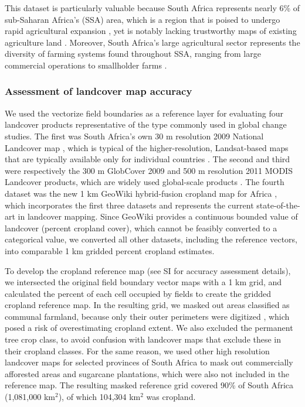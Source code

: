 \documentclass[a4paper]{article}
\begin{document}
This dataset is particularly valuable because South Africa represents nearly 6\% of sub-Saharan Africa's (SSA) area, which is a region that is poised to undergo rapid agricultural expansion \citep{searchinger_high_2015}, yet is notably lacking trustworthy maps of existing agriculture land \citep{fritz_comparison_2010}. Moreover, South Africa's large agricultural sector represents the diversity of farming systems found throughout SSA, ranging from large commercial operations to smallholder farms \citep{hardy_rainfed_2011,estes_using_2014}.

\subsubsection*{Assessment of landcover map accuracy}
We used the vectorize field boundaries as a reference layer for evaluating four landcover products representative of the type commonly used in global change studies. The first was South Africa's own 30 m resolution 2009 National Landcover map \citep[SA-LC][]{sanbi_national_2009}, which is typical of the higher-resolution, Landsat-based maps that are typically available only for individual countries \citep[e.g.][]{fry_completion_2009}. The second and third were respectively the 300 m GlobCover 2009 \citep{arino_global_2012} and 500 m resolution 2011 MODIS Landcover products, which are widely used global-scale products \citep[e.g.][]{gross_monitoring_2013, shackelford_conservation_2015}. The fourth dataset was the new 1 km GeoWiki hybrid-fusion cropland map for Africa \citep{fritz_mapping_2015}, which incorporates the first three datasets and represents the current state-of-the-art in landcover mapping.  Since GeoWiki provides a continuous bounded value of landcover (percent cropland cover), which cannot be feasibly converted to a categorical value, we converted all other datasets, including the reference vectors, into comparable 1 km gridded percent cropland estimates. 

To develop the cropland reference map (see SI for accuracy assessment details), we intersected the original field boundary vector maps with a 1 km grid, and calculated the percent of each cell occupied by fields to create the gridded cropland reference map. In the resulting grid, we masked out areas classified as communal farmland, because only their outer perimeters were digitized \citep{fourie_better_2009}, which posed a risk of overestimating cropland extent. We also excluded the permanent tree crop class, to avoid confusion with landcover maps that exclude these in their cropland classes. For the same reason, we used other high resolution landcover maps for selected provinces of South Africa to mask out commercially afforested areas and sugarcane plantations, which were also not included in the reference map. The resulting masked reference grid covered 90\% of South Africa (1,081,000 km$^2$), of which 104,304 km$^2$ was cropland.
\end{document}
